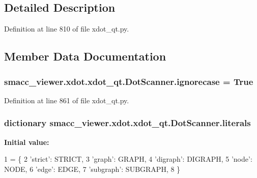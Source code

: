 \subsection{Detailed Description}


Definition at line 810 of file xdot\+\_\+qt.\+py.



\subsection{Member Data Documentation}
\subsubsection[{\texorpdfstring{ignorecase}{ignorecase}}]{ smacc\+\_\+viewer.\+xdot.\+xdot\+\_\+qt.\+Dot\+Scanner.\+ignorecase = {\bf True}\hspace{0.3cm}{\ttfamily [static]}}\hypertarget{classsmacc__viewer_1_1xdot_1_1xdot__qt_1_1DotScanner_a40067d1427198e7d89dff89bab3d7605}{}\label{classsmacc__viewer_1_1xdot_1_1xdot__qt_1_1DotScanner_a40067d1427198e7d89dff89bab3d7605}


Definition at line 861 of file xdot\+\_\+qt.\+py.

\subsubsection[{\texorpdfstring{literals}{literals}}]{\setlength{\rightskip}{0pt plus 5cm}dictionary smacc\+\_\+viewer.\+xdot.\+xdot\+\_\+qt.\+Dot\+Scanner.\+literals\hspace{0.3cm}{\ttfamily [static]}}\hypertarget{classsmacc__viewer_1_1xdot_1_1xdot__qt_1_1DotScanner_aa0c6015194ae00e9eb25d54f288c617b}{}\label{classsmacc__viewer_1_1xdot_1_1xdot__qt_1_1DotScanner_aa0c6015194ae00e9eb25d54f288c617b}
{\bfseries Initial value\+:}
\begin{DoxyCode}
1 = \{
2         \textcolor{stringliteral}{'strict'}: STRICT,
3         \textcolor{stringliteral}{'graph'}: GRAPH,
4         \textcolor{stringliteral}{'digraph'}: DIGRAPH,
5         \textcolor{stringliteral}{'node'}: NODE,
6         \textcolor{stringliteral}{'edge'}: EDGE,
7         \textcolor{stringliteral}{'subgraph'}: SUBGRAPH,
8     \}
\end{DoxyCode}


